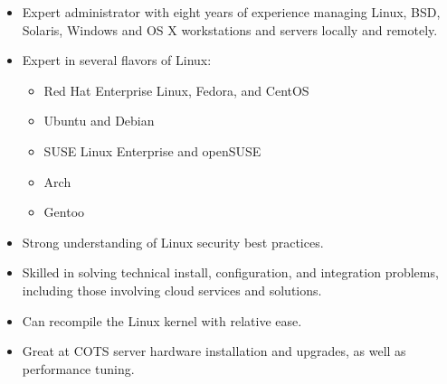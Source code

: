 \documentclass[a4paper,12pt]{memoir} %
\begin{document}
\userinformation %

\framebreak %






\begin{itemize}
	\item Expert administrator with eight years of experience managing Linux, BSD,
		Solaris, Windows and OS X workstations and servers locally and remotely.
	\item Expert in several flavors of Linux:
		\begin{itemize}
			\item Red Hat Enterprise Linux, Fedora, and CentOS
			\item Ubuntu and Debian
			\item SUSE Linux Enterprise and openSUSE
			\item Arch
			\item Gentoo
		\end{itemize}
	\item Strong understanding of Linux security best practices.
	\item Skilled in solving technical install, configuration, and integration problems, including
		those involving cloud services and solutions.
	\item Can recompile the Linux kernel with relative ease.
	\item Great at COTS server hardware installation and upgrades, as well as performance tuning.
\end{itemize}
\Sep
\end{document}

